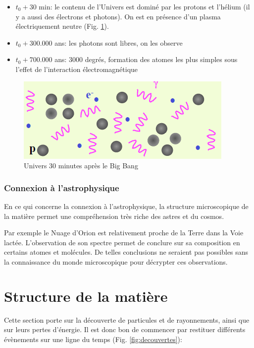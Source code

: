 \begin{itemize}
    \item $t_0+30$ min: le contenu de l'Univers est dominé par les protons et l'hélium (il y a aussi des électrons et photons). On est en présence d'un plasma électriquement neutre (Fig. \ref{fig:BB_30mn}).
    \item $t_0 + 300.000$ ans: les photons sont libres, on les observe
    \item $t_0 + 700.000$ ans: 3000 degrés, formation des atomes les plus simples sous l'effet de l'interaction électromagnétique
\end{itemize}

\begin{figure}[ht]
    \centering
    \includegraphics[scale=0.50]{Images1/30min.png}
    \caption{Univers 30 minutes après le Big Bang}
    \label{fig:BB_30mn}
\end{figure}

\subsubsection{Connexion à l'astrophysique}
En ce qui concerne la connexion à l'astrophysique, la structure microscopique de la matière permet une compréhension très riche des astres et du cosmos.

Par exemple le Nuage d'Orion est relativement proche de la Terre dans la Voie lactée. L'observation de son spectre permet de conclure sur sa composition en certains atomes et molécules. De telles conclusions ne seraient pas possibles sans la connaissance du monde microscopique pour décrypter ces observations.


\section{Structure de la matière}
Cette section porte sur la découverte de particules et de rayonnements, ainsi que sur leurs pertes d'énergie. Il est donc bon de commencer par restituer différents évènements sur une ligne du temps (Fig. \ref{fig:decouvertes}):

